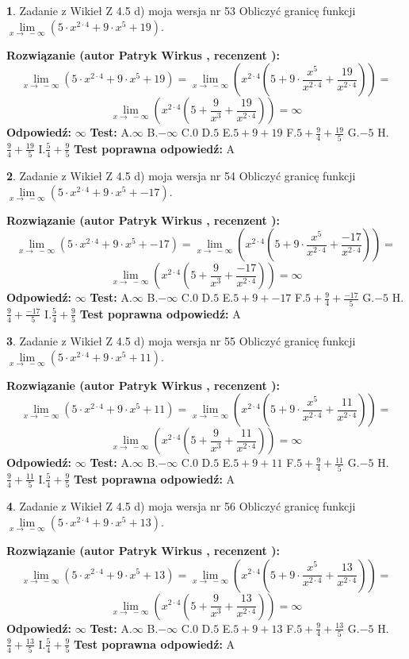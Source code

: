 \documentclass[12pt, a4paper]{article}
\theoremstyle{definition} %
\newtheorem{zad}{}
\newcommand{\zadStart}[1]{\begin{zad}#1\newline}
\newcommand{\zadStop}{\end{zad}}
\newcommand{\rozwStart}[2]{\noindent \textbf{Rozwiązanie (autor #1 , recenzent #2): }\newline}
\newcommand{\rozwStop}{\newline}
\newcommand{\odpStart}{\noindent \textbf{Odpowiedź:}\newline}
\newcommand{\odpStop}{\newline}
\newcommand{\testStart}{\noindent \textbf{Test:}\newline}
\newcommand{\testStop}{\newline}
\newcommand{\kluczStart}{\noindent \textbf{Test poprawna odpowiedź:}\newline}
\newcommand{\kluczStop}{\newline}
\begin{document}
\zadStart{Zadanie z Wikieł Z 4.5 d) moja wersja nr 53}
Obliczyć granicę funkcji  $\lim\limits_{x\to\ -\infty}(5 \cdot x^{2\cdot4}+9 \cdot x^{5}+19)$.
\zadStop
\rozwStart{Patryk Wirkus}{}
$$\lim\limits_{x\to\ -\infty}(5 \cdot x^{2\cdot4}+9 \cdot x^{5}+19) = \lim\limits_{x\to\ -\infty}(x^{2\cdot4}(5 +9 \cdot \frac{x^{5}}{x^{2\cdot4}}+\frac{19}{x^{2\cdot4}})) =$$ $$\lim\limits_{x\to\ -\infty}(x^{2\cdot4}(5 +\frac{9}{x^{3}}+\frac{19}{x^{2\cdot4}})) =\infty$$
\rozwStop
\odpStart
$\infty$
\odpStop
\testStart
A.$\infty$ B.$-\infty$ C.$0$ D.$5$ E.$5 + 9 + 19$
F.$5+\frac{9}{4}+\frac{19}{5}$ G.$-5$
H.$\frac{9}{4}+\frac{19}{5}$
I.$\frac{5}{4}+\frac{9}{5}$
\testStop
\kluczStart
A
\kluczStop



\zadStart{Zadanie z Wikieł Z 4.5 d) moja wersja nr 54}
Obliczyć granicę funkcji  $\lim\limits_{x\to\ -\infty}(5 \cdot x^{2\cdot4}+9 \cdot x^{5}+-17)$.
\zadStop
\rozwStart{Patryk Wirkus}{}
$$\lim\limits_{x\to\ -\infty}(5 \cdot x^{2\cdot4}+9 \cdot x^{5}+-17) = \lim\limits_{x\to\ -\infty}(x^{2\cdot4}(5 +9 \cdot \frac{x^{5}}{x^{2\cdot4}}+\frac{-17}{x^{2\cdot4}})) =$$ $$\lim\limits_{x\to\ -\infty}(x^{2\cdot4}(5 +\frac{9}{x^{3}}+\frac{-17}{x^{2\cdot4}})) =\infty$$
\rozwStop
\odpStart
$\infty$
\odpStop
\testStart
A.$\infty$ B.$-\infty$ C.$0$ D.$5$ E.$5 + 9 + -17$
F.$5+\frac{9}{4}+\frac{-17}{5}$ G.$-5$
H.$\frac{9}{4}+\frac{-17}{5}$
I.$\frac{5}{4}+\frac{9}{5}$
\testStop
\kluczStart
A
\kluczStop



\zadStart{Zadanie z Wikieł Z 4.5 d) moja wersja nr 55}
Obliczyć granicę funkcji  $\lim\limits_{x\to\ -\infty}(5 \cdot x^{2\cdot4}+9 \cdot x^{5}+11)$.
\zadStop
\rozwStart{Patryk Wirkus}{}
$$\lim\limits_{x\to\ -\infty}(5 \cdot x^{2\cdot4}+9 \cdot x^{5}+11) = \lim\limits_{x\to\ -\infty}(x^{2\cdot4}(5 +9 \cdot \frac{x^{5}}{x^{2\cdot4}}+\frac{11}{x^{2\cdot4}})) =$$ $$\lim\limits_{x\to\ -\infty}(x^{2\cdot4}(5 +\frac{9}{x^{3}}+\frac{11}{x^{2\cdot4}})) =\infty$$
\rozwStop
\odpStart
$\infty$
\odpStop
\testStart
A.$\infty$ B.$-\infty$ C.$0$ D.$5$ E.$5 + 9 + 11$
F.$5+\frac{9}{4}+\frac{11}{5}$ G.$-5$
H.$\frac{9}{4}+\frac{11}{5}$
I.$\frac{5}{4}+\frac{9}{5}$
\testStop
\kluczStart
A
\kluczStop



\zadStart{Zadanie z Wikieł Z 4.5 d) moja wersja nr 56}
Obliczyć granicę funkcji  $\lim\limits_{x\to\ -\infty}(5 \cdot x^{2\cdot4}+9 \cdot x^{5}+13)$.
\zadStop
\rozwStart{Patryk Wirkus}{}
$$\lim\limits_{x\to\ -\infty}(5 \cdot x^{2\cdot4}+9 \cdot x^{5}+13) = \lim\limits_{x\to\ -\infty}(x^{2\cdot4}(5 +9 \cdot \frac{x^{5}}{x^{2\cdot4}}+\frac{13}{x^{2\cdot4}})) =$$ $$\lim\limits_{x\to\ -\infty}(x^{2\cdot4}(5 +\frac{9}{x^{3}}+\frac{13}{x^{2\cdot4}})) =\infty$$
\rozwStop
\odpStart
$\infty$
\odpStop
\testStart
A.$\infty$ B.$-\infty$ C.$0$ D.$5$ E.$5 + 9 + 13$
F.$5+\frac{9}{4}+\frac{13}{5}$ G.$-5$
H.$\frac{9}{4}+\frac{13}{5}$
I.$\frac{5}{4}+\frac{9}{5}$
\testStop
\kluczStart
A
\kluczStop
\end{document}
